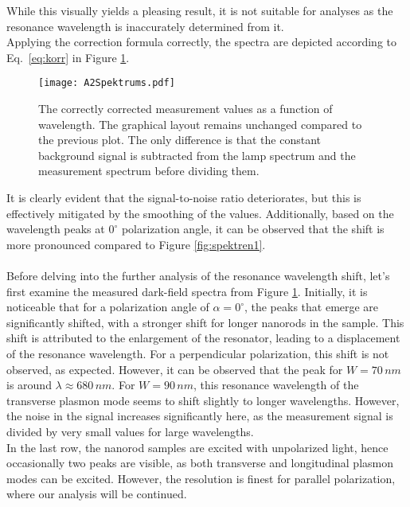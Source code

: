 While this visually yields a pleasing result, it is not suitable for analyses as 
the resonance wavelength is inaccurately determined from it. \\
Applying the correction formula correctly, the spectra are depicted according to 
Eq.~\eqref{eq:korr} in Figure \ref{fig:spektren2}.
\begin{figure}[h!]
    \centering
    \texttt{[image: A2Spektrums.pdf]}
    \caption{\label{fig:spektren2}The correctly corrected measurement values as a function of wavelength. 
    The graphical layout remains unchanged compared to the previous plot. 
    The only difference is that the constant background signal is subtracted from the lamp 
    spectrum and the measurement spectrum before dividing them.}
\end{figure} \FloatBarrier
It is clearly evident that the signal-to-noise ratio deteriorates, 
but this is effectively mitigated by the smoothing of the values. 
Additionally, based on the wavelength peaks at $0^{\circ}$ polarization angle, 
it can be observed that the shift is more pronounced compared to Figure \ref{fig:spektren1}. \\ \\
Before delving into the further analysis of the resonance wavelength shift, 
let's first examine the measured dark-field spectra from Figure \ref{fig:spektren2}. 
Initially, it is noticeable that for a polarization angle of $\alpha=0^{\circ}$, 
the peaks that emerge are significantly shifted, with a stronger shift for longer nanorods in the sample. 
This shift is attributed to the enlargement of the resonator, leading to a displacement 
of the resonance wavelength. 
For a perpendicular polarization, this shift is not observed, as expected. 
However, it can be observed that the peak for $W=70\,\si{nm}$ is around $\lambda\approx 680\,\si{nm}$. 
For $W=90\,\si{nm}$, this resonance wavelength of the transverse plasmon mode seems to shift 
slightly to longer wavelengths. 
However, the noise in the signal increases significantly here, as the measurement signal 
is divided by very small values for large wavelengths. \\
In the last row, the nanorod samples are excited with unpolarized light, 
hence occasionally two peaks are visible, as both transverse and longitudinal plasmon modes can be excited. 
However, the resolution is finest for parallel polarization, where our analysis will be continued. \\ \\

